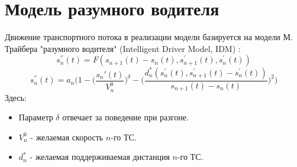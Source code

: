 \section{Модель разумного водителя}
Движение транспортного потока в реализации модели базируется на модели М. Трайбера "разумного водителя" (Intelligent Driver Model, IDM) \cite{book-Gasnikov}:
\begin{equation}
	s_{n}^{''}(t) = F(s_{n+1}(t) - s_{n}(t), s_{n+1}^{'}(t), s_{n}^{'}(t))
\end{equation}
\begin{equation}
	s_n^{''}(t) = a_n \bigg(1 - \bigg(\frac{s_n{'}(t)}{V_n^0}\bigg)^\delta - \bigg( 
	\frac{d_{n}^{*}(s_{n}^{'}(t), s_{n+1}^{'}(t)-s_{n}^{'}(t))}{s_{n+1}(t)-s_{n}(t)}\bigg)^2\bigg)
\end{equation}
Здесь:
\begin{itemize}
	\item Параметр $\delta$ отвечает за поведение при разгоне.
	\item $V_n^0$ - желаемая скорость $n$-го ТС.
	\item $d_{n}^{*}$ - желаемая поддерживаемая дистанция $n$-го ТС.
\end{itemize}
%
